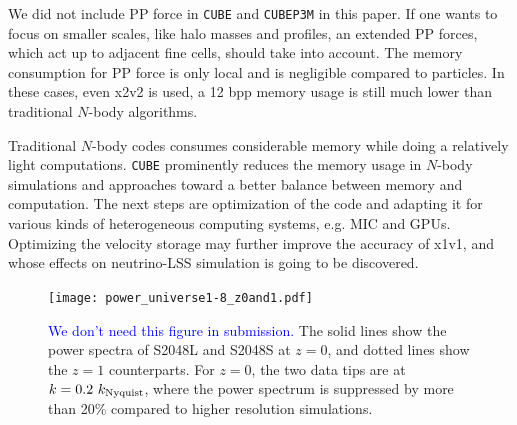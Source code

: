\documentclass[10pt,twocolumn,preprint]{emulateapj}
\newcommand{\tcb}{\textcolor{blue}}
\begin{document}
We did not include PP force in {\tt CUBE} and {\tt CUBEP3M} in this paper. If one wants to focus on smaller scales, like halo masses and profiles, an extended PP forces, which act up to adjacent fine cells, should take into account. The memory consumption for PP force is only local and is negligible compared to particles. In these cases, even x2v2 is used, a 12 bpp memory usage is still much lower than traditional $N$-body algorithms.

Traditional $N$-body codes consumes considerable memory while doing a relatively light computations. {\tt CUBE} prominently reduces the memory usage in $N$-body simulations and approaches toward a better balance between memory and computation. The next steps are optimization of the code and adapting it for various kinds of heterogeneous computing systems, e.g. MIC and GPUs. Optimizing the velocity storage may further improve the accuracy of x1v1, and whose effects on neutrino-LSS simulation is going to be discovered.


\begin{figure}
\centering
  \texttt{[image: power\_universe1-8\_z0and1.pdf]}
 \caption{\tcb{We don't need this figure in submission.} The solid lines show the power spectra of S2048L and S2048S at $z=0$, and dotted lines show the $z=1$ counterparts. For $z=0$, the two data tips are at $k=0.2\ k_{\rm Nyquist}$, where the power spectrum is suppressed by more than 20\% compared to higher resolution simulations.}
\label{fig.power}
\end{figure}






\acknowledgements



\end{document}
